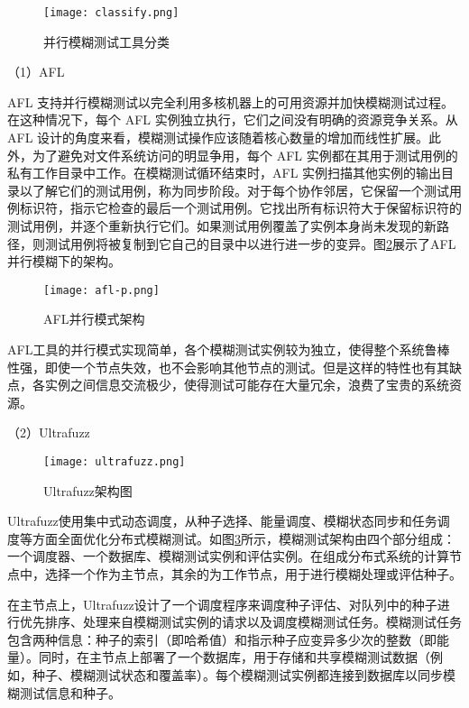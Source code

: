 \documentclass[master]{thesis-uestc}
\begin{document}
\begin{figure}[!htbp]
    \vspace{6pt}
    \centering
    \texttt{[image: classify.png]}
    \caption{并行模糊测试工具分类}
    \label{classify}
\end{figure}

（1）AFL

AFL 支持并行模糊测试以完全利用多核机器上的可用资源并加快模糊测试过程。在这种情况下，每个 AFL 实例独立执行，它们之间没有明确的资源竞争关系。从 AFL 设计的角度来看，模糊测试操作应该随着核心数量的增加而线性扩展。此外，为了避免对文件系统访问的明显争用，每个 AFL 实例都在其用于测试用例的私有工作目录中工作。在模糊测试循环结束时，AFL 实例扫描其他实例的输出目录以了解它们的测试用例，称为同步阶段。对于每个协作邻居，它保留一个测试用例标识符，指示它检查的最后一个测试用例。它找出所有标识符大于保留标识符的测试用例，并逐个重新执行它们。如果测试用例覆盖了实例本身尚未发现的新路径，则测试用例将被复制到它自己的目录中以进行进一步的变异。图\ref{aflp}展示了AFL并行模糊下的架构。

\begin{figure}[!htbp]
    \vspace{6pt}
    \centering
    \texttt{[image: afl-p.png]}
    \caption{AFL并行模式架构}
    \label{aflp}
\end{figure}

AFL工具的并行模式实现简单，各个模糊测试实例较为独立，使得整个系统鲁棒性强，即使一个节点失效，也不会影响其他节点的测试。但是这样的特性也有其缺点，各实例之间信息交流极少，使得测试可能存在大量冗余，浪费了宝贵的系统资源。

（2）Ultrafuzz


\begin{figure}[!htbp]
    \vspace{6pt}
    \centering
    \texttt{[image: ultrafuzz.png]}
    \caption{Ultrafuzz架构图}
    \label{ultrafuzz}
\end{figure}

Ultrafuzz使用集中式动态调度，从种子选择、能量调度、模糊状态同步和任务调度等方面全面优化分布式模糊测试。如图\ref{ultrafuzz}所示，模糊测试架构由四个部分组成：一个调度器、一个数据库、模糊测试实例和评估实例。在组成分布式系统的计算节点中，选择一个作为主节点，其余的为工作节点，用于进行模糊处理或评估种子。

在主节点上，Ultrafuzz设计了一个调度程序来调度种子评估、对队列中的种子进行优先排序、处理来自模糊测试实例的请求以及调度模糊测试任务。模糊测试任务包含两种信息：种子的索引（即哈希值）和指示种子应变异多少次的整数（即能量）。同时，在主节点上部署了一个数据库，用于存储和共享模糊测试数据（例如，种子、模糊测试状态和覆盖率）。每个模糊测试实例都连接到数据库以同步模糊测试信息和种子。
\end{document}
